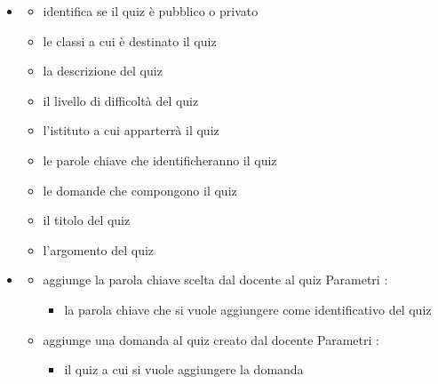 \begin{itemize}
\item {}
\begin{itemize}
\item {}
\newline
identifica se il quiz è pubblico o privato
\item {}
\newline
le classi a cui è destinato il quiz
\item {}
\newline
la descrizione del quiz
\item {}
\newline
il livello di difficoltà del quiz
\item {}
\newline
l'istituto a cui apparterrà il quiz
\item {}
\newline
le parole chiave che identificheranno il quiz
\item {}
\newline
le domande che compongono il quiz
\item {}
\newline
il titolo del quiz
\item {}
\newline
l'argomento del quiz
\end{itemize}
\item {}
\begin{itemize}
\item {}
\newline
aggiunge la parola chiave scelta dal docente al quiz
\newline
Parametri :
\begin{itemize}
\item {}
\newline
la parola chiave che si vuole aggiungere come identificativo del quiz
\end{itemize}
\item {}
\newline
aggiunge una domanda al quiz creato dal docente
\newline
Parametri :
\begin{itemize}
\item {}
\newline
il quiz a cui si vuole aggiungere la domanda
\end{itemize}
\end{itemize}
\end{itemize}
